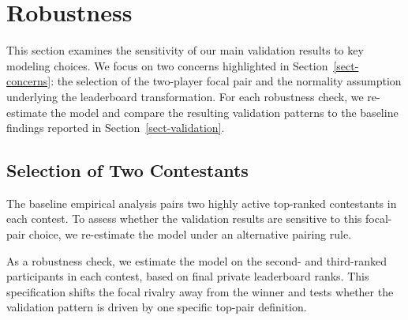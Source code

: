 \documentclass[mnsc]{informs3}
\begin{document}
\section{Robustness}

This section examines the sensitivity of our main validation results to key modeling choices.
We focus on two concerns highlighted in Section~\ref{sect-concerns}: the selection of the two-player focal pair and the normality assumption underlying the leaderboard transformation. For each robustness check, we re-estimate the model and compare the resulting validation patterns to the baseline findings reported in Section~\ref{sect-validation}.

\subsection{Selection of Two Contestants}\label{sect-robust-2players}

The baseline empirical analysis pairs two highly active top-ranked contestants in each contest.
To assess whether the validation results are sensitive to this focal-pair choice, we re-estimate the model under an alternative pairing rule.

As a robustness check, we estimate the model on the second- and third-ranked participants in each contest, based on final private leaderboard ranks.
This specification shifts the focal rivalry away from the winner and tests whether the validation pattern is driven by one specific top-pair definition.
\end{document}
